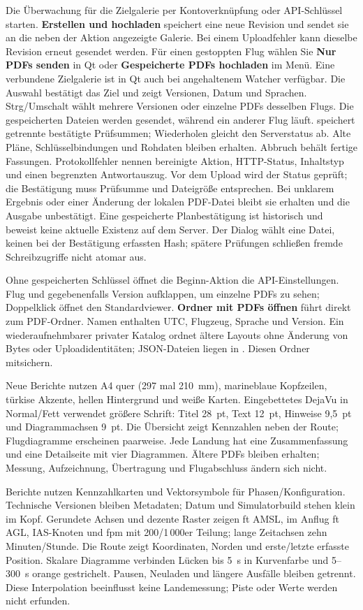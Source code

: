 \documentclass[11pt,a4paper]{article}
\newcommand{\filepath}[1]{\path{#1}}
\newcommand{\ui}[1]{\textbf{#1}}
\begin{document}
Die Überwachung für die Zielgalerie per Kontoverknüpfung oder API-Schlüssel
starten. \ui{Erstellen und hochladen} speichert eine neue Revision und sendet
sie an die neben der Aktion angezeigte Galerie. Bei einem Uploadfehler kann
dieselbe Revision erneut gesendet werden. Für einen gestoppten Flug wählen Sie
\ui{Nur PDFs senden} in Qt oder \ui{Gespeicherte PDFs hochladen} im Menü.
Eine verbundene Zielgalerie ist in Qt auch bei angehaltenem Watcher verfügbar.
Die Auswahl bestätigt das Ziel und zeigt Versionen, Datum und Sprachen.
Strg/Umschalt wählt mehrere Versionen oder einzelne PDFs desselben Flugs.
Die gespeicherten Dateien werden gesendet, während ein anderer Flug läuft.
\filepath{upload-receipts.json} speichert getrennte
bestätigte Prüfsummen; Wiederholen gleicht den Serverstatus ab. Alte Pläne,
Schlüsselbindungen und Rohdaten bleiben erhalten. Abbruch behält fertige
Fassungen. Protokollfehler nennen bereinigte Aktion, HTTP-Status, Inhaltstyp
und einen begrenzten Antwortauszug.
Vor dem Upload wird der Status geprüft; die Bestätigung muss Prüfsumme und
Dateigröße entsprechen. Bei unklarem Ergebnis oder einer Änderung der lokalen
PDF-Datei bleibt sie erhalten und die Ausgabe unbestätigt. Eine gespeicherte
Planbestätigung ist historisch und beweist keine aktuelle Existenz auf dem Server.
Der Dialog wählt eine Datei, keinen bei der Bestätigung erfassten Hash;
spätere Prüfungen schließen fremde Schreibzugriffe nicht atomar aus.

Ohne gespeicherten Schlüssel öffnet die Beginn-Aktion die API-Einstellungen.
Flug und gegebenenfalls Version aufklappen, um einzelne PDFs zu sehen;
Doppelklick öffnet den Standardviewer.
\ui{Ordner mit PDFs öffnen} führt direkt zum PDF-Ordner. Namen enthalten UTC,
Flugzeug, Sprache und Version. Ein wiederaufnehmbarer privater Katalog ordnet
ältere Layouts ohne Änderung von Bytes oder Uploadidentitäten; JSON-Dateien
liegen in \filepath{reports/.metadata/}. Diesen Ordner mitsichern.

Neue Berichte nutzen A4 quer (297 mal 210~mm), marineblaue Kopfzeilen,
türkise Akzente, hellen Hintergrund und weiße Karten. Eingebettetes DejaVu in
Normal/Fett verwendet größere Schrift: Titel 28~pt, Text 12~pt, Hinweise
9,5~pt und Diagrammachsen 9~pt. Die Übersicht zeigt Kennzahlen neben der Route;
Flugdiagramme erscheinen paarweise. Jede Landung hat eine Zusammenfassung und
eine Detailseite mit vier Diagrammen. Ältere PDFs bleiben erhalten; Messung,
Aufzeichnung, Übertragung und Flugabschluss ändern sich nicht.

Berichte nutzen Kennzahlkarten und Vektorsymbole für Phasen/Konfiguration.
Technische Versionen bleiben Metadaten; Datum und Simulatorbuild stehen klein
im Kopf. Gerundete Achsen und dezente Raster zeigen ft AMSL, im Anflug ft AGL,
IAS-Knoten und fpm mit 200/1\,000er Teilung; lange Zeitachsen zehn
Minuten/Stunde.
Die Route zeigt Koordinaten, Norden und erste/letzte erfasste Position.
Skalare Diagramme verbinden Lücken bis 5~s in Kurvenfarbe und 5--300~s orange
gestrichelt. Pausen, Neuladen und längere Ausfälle bleiben getrennt. Diese
Interpolation beeinflusst keine Landemessung; Piste oder Werte werden nicht
erfunden.
\end{document}
